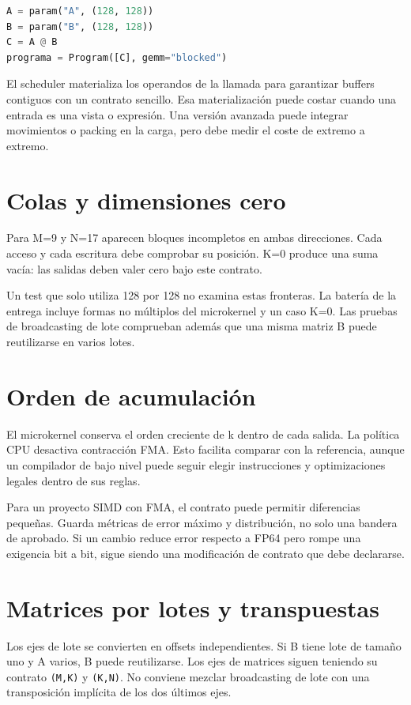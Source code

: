 \documentclass[12pt,a4paper,oneside]{report}
\begin{document}
\begin{lstlisting}[language=Python]
A = param("A", (128, 128))
B = param("B", (128, 128))
C = A @ B
programa = Program([C], gemm="blocked")
\end{lstlisting}
El scheduler materializa los operandos de la llamada para garantizar buffers contiguos con un contrato sencillo. Esa materialización puede costar cuando una entrada es una vista o expresión. Una versión avanzada puede integrar movimientos o packing en la carga, pero debe medir el coste de extremo a extremo.

\section{Colas y dimensiones cero}
Para M=9 y N=17 aparecen bloques incompletos en ambas direcciones. Cada acceso y cada escritura debe comprobar su posición. K=0 produce una suma vacía: las salidas deben valer cero bajo este contrato.

Un test que solo utiliza 128 por 128 no examina estas fronteras. La batería de la entrega incluye formas no múltiplos del microkernel y un caso K=0. Las pruebas de broadcasting de lote comprueban además que una misma matriz B puede reutilizarse en varios lotes.

\section{Orden de acumulación}
El microkernel conserva el orden creciente de k dentro de cada salida. La política CPU desactiva contracción FMA. Esto facilita comparar con la referencia, aunque un compilador de bajo nivel puede seguir elegir instrucciones y optimizaciones legales dentro de sus reglas.

Para un proyecto SIMD con FMA, el contrato puede permitir diferencias pequeñas. Guarda métricas de error máximo y distribución, no solo una bandera de aprobado. Si un cambio reduce error respecto a FP64 pero rompe una exigencia bit a bit, sigue siendo una modificación de contrato que debe declararse.

\section{Matrices por lotes y transpuestas}
Los ejes de lote se convierten en offsets independientes. Si B tiene lote de tamaño uno y A varios, B puede reutilizarse. Los ejes de matrices siguen teniendo su contrato \texttt{(M,K)} y \texttt{(K,N)}. No conviene mezclar broadcasting de lote con una transposición implícita de los dos últimos ejes.
\end{document}
